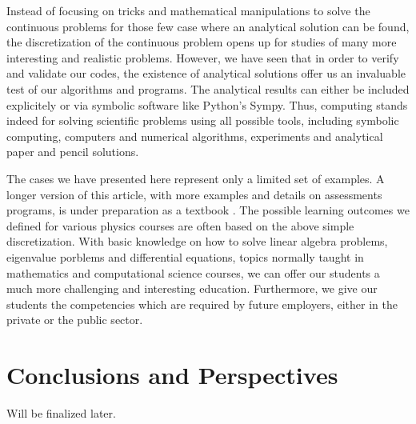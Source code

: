\documentclass[graybox,envcountchap,sectrefs]{svmult}
\begin{document}
Instead of focusing on tricks and mathematical manipulations to solve
the continuous problems for those few case where an analytical
solution can be found, the discretization of the continuous problem
opens up for studies of many more interesting and realistic problems.
However, we have seen that in order to verify and validate our codes,
the existence of analytical solutions offer us an invaluable test of
our algorithms and programs. The analytical results can either be
included explicitely or via symbolic software like Python's Sympy.
Thus, computing stands indeed for solving scientific problems using
all possible tools, including symbolic computing, computers and
numerical algorithms, experiments and analytical paper and pencil
solutions.

The cases we have presented here represent only a limited set of
examples. A longer version of this article, with more examples and
details on assessments programs, is under preparation as a textbook
\cite{DannyMortenBook}.  The possible learning outcomes we defined for
various physics courses are often based on the above simple
discretization. With basic knowledge on how to solve linear algebra
problems, eigenvalue porblems and differential equations, topics
normally taught in mathematics and computational science courses, we
can offer our students a much more challenging and interesting
education. Furthermore, we give our students the competencies which are
required by future employers, either in the private or the public
sector.


\section{Conclusions and Perspectives}

Will be finalized later.
\end{document}
